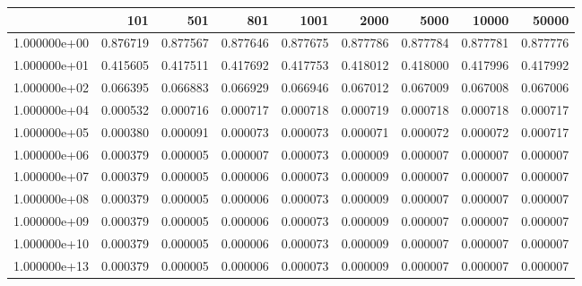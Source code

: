 \begin{tabular}{lrrrrrrrr}
\toprule
{} &     101   &     501   &     801   &     1001  &     2000  &     5000  &     10000 &     50000 \\
\midrule
1.000000e+00 &  0.876719 &  0.877567 &  0.877646 &  0.877675 &  0.877786 &  0.877784 &  0.877781 &  0.877776 \\
1.000000e+01 &  0.415605 &  0.417511 &  0.417692 &  0.417753 &  0.418012 &  0.418000 &  0.417996 &  0.417992 \\
1.000000e+02 &  0.066395 &  0.066883 &  0.066929 &  0.066946 &  0.067012 &  0.067009 &  0.067008 &  0.067006 \\
1.000000e+04 &  0.000532 &  0.000716 &  0.000717 &  0.000718 &  0.000719 &  0.000718 &  0.000718 &  0.000717 \\
1.000000e+05 &  0.000380 &  0.000091 &  0.000073 &  0.000073 &  0.000071 &  0.000072 &  0.000072 &  0.000717 \\
1.000000e+06 &  0.000379 &  0.000005 &  0.000007 &  0.000073 &  0.000009 &  0.000007 &  0.000007 &  0.000007 \\
1.000000e+07 &  0.000379 &  0.000005 &  0.000006 &  0.000073 &  0.000009 &  0.000007 &  0.000007 &  0.000007 \\
1.000000e+08 &  0.000379 &  0.000005 &  0.000006 &  0.000073 &  0.000009 &  0.000007 &  0.000007 &  0.000007 \\
1.000000e+09 &  0.000379 &  0.000005 &  0.000006 &  0.000073 &  0.000009 &  0.000007 &  0.000007 &  0.000007 \\
1.000000e+10 &  0.000379 &  0.000005 &  0.000006 &  0.000073 &  0.000009 &  0.000007 &  0.000007 &  0.000007 \\
1.000000e+13 &  0.000379 &  0.000005 &  0.000006 &  0.000073 &  0.000009 &  0.000007 &  0.000007 &  0.000007 \\
\bottomrule
\end{tabular}
